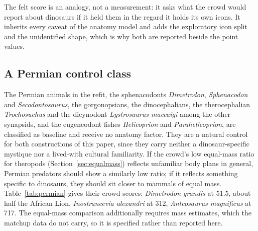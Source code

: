 \documentclass[11pt]{article}
\begin{document}
The felt score is an analogy, not a measurement: it asks what the crowd would report about dinosaurs if it held them in the regard it holds its own icons. It inherits every caveat of the anatomy model and adds the exploratory icon split and the unidentified shape, which is why both are reported beside the point values.

\subsection{A Permian control class}
\label{sec:permian}
The Permian animals in the refit, the sphenacodonts \textit{Dimetrodon}, \textit{Sphenacodon} and \textit{Secodontosaurus}, the gorgonopsians, the dinocephalians, the therocephalian \textit{Trochosuchus} and the dicynodont \textit{Lystrosaurus maccaigi} among the other synapsids, and the eugeneodont fishes \textit{Helicoprion} and \textit{Parahelicoprion}, are classified as baseline and receive no anatomy factor. They are a natural control for both constructions of this paper, since they carry neither a dinosaur-specific mystique nor a lived-with cultural familiarity. If the crowd's low equal-mass ratio for theropods (Section~\ref{sec:equalmass}) reflects unfamiliar body plans in general, Permian predators should show a similarly low ratio; if it reflects something specific to dinosaurs, they should sit closer to mammals of equal mass. Table~\ref{tab:permian} gives their crowd scores: \textit{Dimetrodon grandis} at 51.5, about half the African Lion, \textit{Inostrancevia alexandri} at 312, \textit{Anteosaurus magnificus} at 717. The equal-mass comparison additionally requires mass estimates, which the matchup data do not carry, so it is specified rather than reported here.
\end{document}
